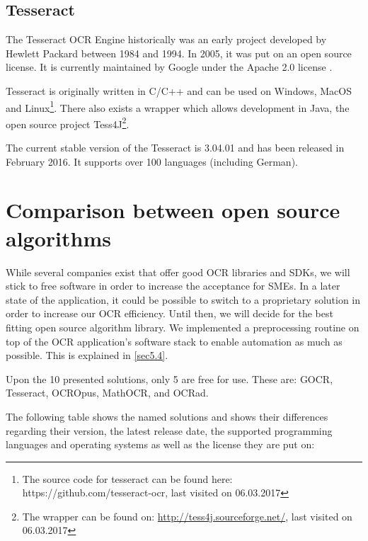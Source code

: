 \label{Tesseract}
\subsection{Tesseract}
The Tesseract OCR Engine historically was an early project developed by Hewlett Packard between 1984 and 1994. In 2005, it was put on an open source license. It is currently maintained by Google under the Apache 2.0 license \cite{smith07}.

Tesseract is originally written in C/C++ and can be used on Windows, MacOS and Linux\footnote{The source code for tesseract can be found here: https://github.com/tesseract-ocr, last visited on 06.03.2017}. There also exists a wrapper which allows development in Java, the open source project Tess4J\footnote{The wrapper can be found on: \url{http://tess4j.sourceforge.net/}, last visited on 06.03.2017}.

The current stable version of the Tesseract is 3.04.01 and has been released in February 2016. It supports over 100 languages (including German). 

\section{Comparison between open source algorithms}
\label{sec3.2}
While several companies exist that offer good OCR libraries and SDKs, we will stick to free software in order to increase the acceptance for SMEs. In a later state of the application, it could be possible to switch to a proprietary solution in order to increase our OCR efficiency. Until then, we will decide for the best fitting open source algorithm library. We implemented a preprocessing routine on top of the OCR application's software stack to enable automation as much as possible. This is explained in \ref{sec5.4}.

Upon the 10 presented solutions, only 5 are free for use. These are: GOCR, Tesseract, OCROpus, MathOCR, and OCRad.

The following table shows the named solutions and shows their differences regarding their version, the latest release date, the supported programming languages and operating systems as well as the license they are put on:

